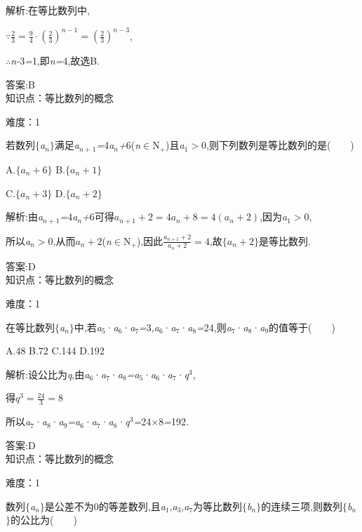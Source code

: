 \documentclass{article} %
\begin{document}
 解析:在等比数列中,

$\because \frac{2}{3}=\frac{9}{4}\cdot (\frac{2}{3})^{n-1}=(\frac{2}{3})^{n-3}$,

\textit{$\therefore$n-}3\textit{=}1,即\textit{n=}4,故选B.

 答案:B \\

知识点：等比数列的概念

难度：1

 若数列$\mathrm{\{}$\textit{a${}_{n}$}$\mathrm{\}}$满足\textit{a${}_{n+}$}${}_{1}$\textit{=}4\textit{a${}_{n}$+}6(\textit{n}$\mathrm{\in}$N\textit{${}_{+}$})且\textit{a}${}_{1}$\textit{$>$}0,则下列数列是等比数列的是(\textit{　　})

 A.$\{a_n+6\}$ B.$\{a_n+1\}$

 C.$\{a_n+3\}$ D.$\{a_n+2\}$

 解析:由\textit{a${}_{n+}$}${}_{1}$\textit{=}4\textit{a${}_{n}$+}6可得$a_{n+1}+2=4a_n+8=4(a_n+2)$,因为\textit{a}${}_{1}$\textit{$>$}0,

所以\textit{a${}_{n}$$>$}0,从而$a_n+2$(\textit{n}$\mathrm{\in}$N\textit{${}_{+}$}),因此$\frac{a_{n+1}+2}{a_n+2}=4$,故$\{a_n+2\}$是等比数列\textit{.}

 答案:D \\

知识点：等比数列的概念

难度：1

 在等比数列$\mathrm{\{}$\textit{a${}_{n}$}$\mathrm{\}}$中,若\textit{a}${}_{5}$·\textit{a}${}_{6}$·\textit{a}${}_{7}$\textit{=}3,\textit{a}${}_{6}$·\textit{a}${}_{7}$·\textit{a}${}_{8}$\textit{=}24,则\textit{a}${}_{7}$·\textit{a}${}_{8}$·\textit{a}${}_{9}$的值等于(\textit{　　})

 A.48 B.72 C.144 D.192

 解析:设公比为\textit{q},由\textit{a}${}_{6}$·\textit{a}${}_{7}$·\textit{a}${}_{8}$\textit{=a}${}_{5}$·\textit{a}${}_{6}$·\textit{a}${}_{7}$·\textit{q}${}^{3}$,

得$q^3=\frac{24}{3}=8$

所以\textit{a}${}_{7}$·\textit{a}${}_{8}$·\textit{a}${}_{9}$\textit{=a}${}_{6}$·\textit{a}${}_{7}$·\textit{a}${}_{8}$·\textit{q}${}^{3}$\textit{=}24\textit{$\times$}8\textit{=}192\textit{.}

 答案:D \\

知识点：等比数列的概念

难度：1

 数列$\mathrm{\{}$\textit{a${}_{n}$}$\mathrm{\}}$是公差不为0的等差数列,且\textit{a}${}_{1}$,\textit{a}${}_{3}$,\textit{a}${}_{7}$为等比数列$\mathrm{\{}$\textit{b${}_{n}$}$\mathrm{\}}$的连续三项,则数列$\mathrm{\{}$\textit{b${}_{n}$}$\mathrm{\}}$的公比为(\textit{　　})
\end{document}
